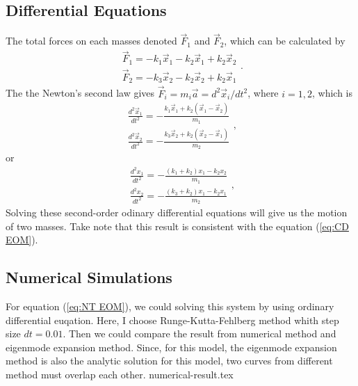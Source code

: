 \documentclass[a4paper, reprint, showkeys, nofootinbib,twoside]{revtex4-1}
\begin{document}
	\subsection{Differential Equations}
	The total forces on each masses denoted $\vec{F}_1$ and $\vec{F}_2$, which can be calculated by
	\begin{equation}
        \begin{aligned}
        \vec{F}_1 = -k_1\vec{x}_1-k_2\vec{x}_1+k_2\vec{x}_2
        \\
        \vec{F}_2 = -k_3\vec{x}_2-k_2\vec{x}_2+k_2\vec{x}_1
        \end{aligned}.
        \end{equation}
        The the Newton's second law gives $\vec{F}_i = m_i\vec{a}={d^2\vec{x}_i}/{dt^2}$, where $i=1,2$, which is
        \begin{equation}
        \begin{aligned}
        \displaystyle \frac{d^2\vec{x}_1}{dt^2} = \displaystyle -\frac{k_1\vec{x}_1+k_2\left(\vec{x}_1-\vec{x}_2\right)}{m_1}\\
        \displaystyle \frac{d^2\vec{x}_2}{dt^2} = \displaystyle -\frac{k_3\vec{x}_2+k_2\left(\vec{x}_2-\vec{x}_1\right)}{m_2}
        \end{aligned},
        \end{equation}
        or 
        \begin{equation}
        \begin{aligned}\label{eq:NT EOM}
        \displaystyle \frac{d^2x_1}{dt^2} = \displaystyle -\frac{\left(k_1+k_2\right)x_1-k_2x_2}{m_1}\\
        \displaystyle \frac{d^2x_2}{dt^2} = \displaystyle -\frac{\left(k_3+k_2\right)x_1-k_2x_1}{m_2}
        \end{aligned},
        \end{equation}
        Solving these second-order odinary differential equations will give us the motion of two masses.
        Take note that this result  is consistent with the equation (\ref{eq:CD EOM}).
	\subsection{Numerical Simulations}
	For equation (\ref{eq:NT EOM}), we could solving this system by using ordinary differential euqation. Here, I choose Runge-Kutta-Fehlberg method whith step size $dt = 0.01$. Then we could compare the result from numerical method and eigenmode expansion method. Since, for this model, the eigenmode expansion method is also the analytic solution for this model, two curves from different method must overlap each other.
	{numerical-result.tex}
\end{document}
